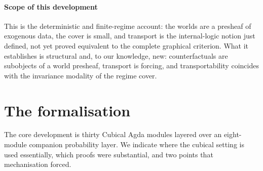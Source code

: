 \documentclass{lmcs}
\begin{document}
\paragraph{Scope of this development}
This is the deterministic and finite-regime account: the worlds are a presheaf of exogenous data, the cover is small, and transport is the internal-logic notion just defined, not yet proved equivalent to the complete graphical criterion.
What it establishes is structural and, to our knowledge, new: counterfactuals are subobjects of a world presheaf, transport is forcing, and transportability coincides with the invariance modality of the regime cover.

\section{The formalisation}\label{sec:formalisation}

The core development is thirty Cubical Agda modules layered over an eight-module companion probability layer.
We indicate where the cubical setting is used essentially, which proofs were substantial, and two points that mechanisation forced.
\end{document}
